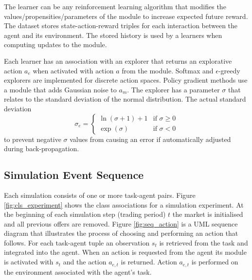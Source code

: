 The learner can be any reinforcement learning algorithm that modifies the
values/propensities/parameters of the module to increase expected future
reward. The dataset stores state-action-reward triples for each interaction between the
agent and its environment.  The stored history is used by a learners when
computing updates to the module.

Each learner has an association with an explorer that returns an explorative
action $a_e$ when activated with action $a$ from the module.  Softmax and
$\epsilon$-greedy explorers are implemented for discrete action spaces.  Policy
gradient methods use a module that adds Gaussian noise to $a_m$.  The explorer
has a parameter $\sigma$ that relates to the standard deviation of the normal
distribution.  The actual standard deviation
\begin{equation}
\sigma_e = \begin{cases}
\ln(\sigma + 1) + 1 & \text{if $\sigma \geq 0$}\\
\exp(\sigma) & \text{if $\sigma < 0$}
\end{cases}
\end{equation}
to prevent negative $\sigma$ values from causing an error if automatically
adjusted during back-propagation.



\subsection{Simulation Event Sequence}
Each simulation consists of one or more task-agent pairs.  Figure
\ref{fig:cls_experiment} shows the class associations for a simulation
experiment.  At the beginning of each simulation step (trading period) $t$ the
market is initialised and all previous offers are removed.  Figure
\ref{fig:seq_action} is a UML sequence diagram that illustrates the process of
choosing and performing an action that follows.  For each task-agent tuple an
observation $s_t$ is retrieved from the task and integrated into the agent.
When an action is requested from the agent its module is activated with $s_t$
and the action $a_{e,t}$ is returned.  Action $a_{e,t}$ is performed on the
environment associated with the agent's task.


